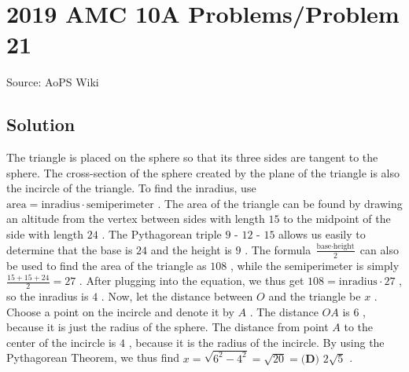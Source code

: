 \documentclass[12pt]{article}
\begin{document}
\section*{{2019 AMC 10A Problems/Problem 21}}
Source: AoPS Wiki

\subsection*{Solution}
The triangle is placed on the sphere so that its three sides are tangent to the sphere. The cross-section of the sphere created by the plane of the triangle is also the incircle of the triangle. To find the inradius, use $\text{area} = \text{inradius} \cdot \text{semiperimeter}$ . The area of the triangle can be found by drawing an altitude from the vertex between sides with length $15$ to the midpoint of the side with length $24$ . The Pythagorean triple $9$ - $12$ - $15$ allows us easily to determine that the base is $24$ and the height is $9$ . The formula $\frac {\text{base} \cdot \text{height}} {2}$ can also be used to find the area of the triangle as $108$ , while the semiperimeter is simply $\frac {15 + 15 + 24} {2} = 27$ . After plugging into the equation, we thus get $108 = \text{inradius} \cdot 27$ , so the inradius is $4$ . Now, let the distance between $O$ and the triangle be $x$ . Choose a point on the incircle and denote it by $A$ . The distance $OA$ is $6$ , because it is just the radius of the sphere. The distance from point $A$ to the center of the incircle is $4$ , because it is the radius of the incircle. By using the Pythagorean Theorem, we thus find $x = \sqrt{6^2-4^2}=\sqrt{20} = \boxed{\textbf {(D) } 2 \sqrt {5}}$ .
\end{document}
